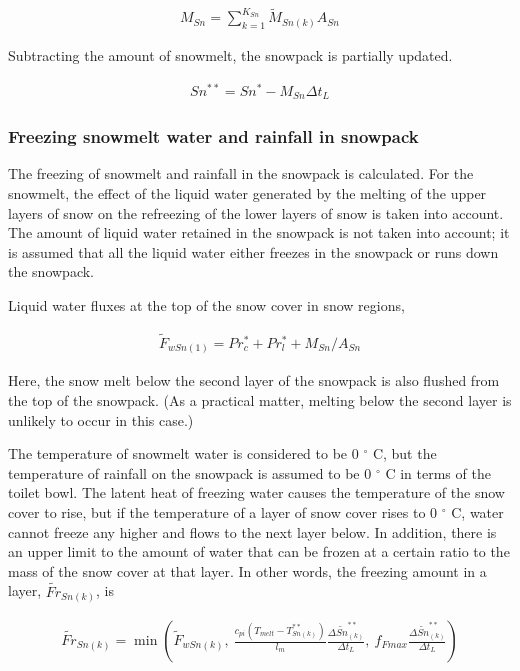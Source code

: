 \begin{eqnarray}
 M_{Sn} = \sum_{k=1}^{K_{Sn}} \widetilde{M}_{Sn(k)} A_{Sn}
\end{eqnarray}

Subtracting the amount of snowmelt, the snowpack is partially updated.

\begin{eqnarray}
 Sn^{**} = Sn^{*} - M_{Sn} \Delta t_L
\end{eqnarray}

\hypertarget{freezing-snowmelt-water-and-rainfall-in-snowpack}{%
\subsubsection{Freezing snowmelt water and rainfall in
snowpack}\label{freezing-snowmelt-water-and-rainfall-in-snowpack}}

The freezing of snowmelt and rainfall in the snowpack is calculated. For
the snowmelt, the effect of the liquid water generated by the melting of
the upper layers of snow on the refreezing of the lower layers of snow
is taken into account. The amount of liquid water retained in the
snowpack is not taken into account; it is assumed that all the liquid
water either freezes in the snowpack or runs down the snowpack.

Liquid water fluxes at the top of the snow cover in snow regions,

\begin{eqnarray}
 \widetilde{F}_{wSn(1)} = Pr_c^* + Pr_l^* + M_{Sn} / A_{Sn}
\end{eqnarray}

Here, the snow melt below the second layer of the snowpack is also
flushed from the top of the snowpack. (As a practical matter, melting
below the second layer is unlikely to occur in this case.)

The temperature of snowmelt water is considered to be 0 \(^{\circ}\) C,
but the temperature of rainfall on the snowpack is assumed to be 0
\(^{\circ}\) C in terms of the toilet bowl. The latent heat of freezing
water causes the temperature of the snow cover to rise, but if the
temperature of a layer of snow cover rises to 0 \(^{\circ}\) C, water
cannot freeze any higher and flows to the next layer below. In addition,
there is an upper limit to the amount of water that can be frozen at a
certain ratio to the mass of the snow cover at that layer. In other
words, the freezing amount in a layer, \(\widetilde{Fr}_{Sn(k)}\), is

\begin{eqnarray}
 \widetilde{Fr}_{Sn(k)} = \min\left( \widetilde{F}_{wSn(k)}, \
\frac{c_{pi}(T_{melt}-T_{Sn(k)}^{**})}{l_m}
\frac{\Delta \widetilde{Sn}_{(k)}^{**}}{\Delta t_L} , \
f_{Fmax}\frac{\Delta \widetilde{Sn}_{(k)}^{**}}{\Delta t_L} \right)
\end{eqnarray}

